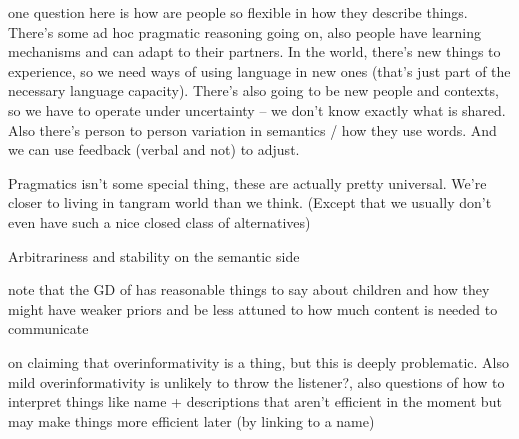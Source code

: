 \documentclass[]{article}
\begin{document}
\cite{hawkins2020b} one question here is how are people so flexible in how they describe things. There's some ad hoc pragmatic reasoning going on, also people have learning mechanisms and can adapt to their partners. In the world, there's new things to experience, so we need ways of using language in new ones (that's just part of the necessary language capacity). There's also going to be new people and contexts, so we have to operate under uncertainty -- we don't know exactly what is shared. Also there's person to person variation in semantics / how they use words. And we can use feedback (verbal and not) to adjust. 

Pragmatics isn't some special thing, these are actually pretty universal. We're closer to living in tangram world than we think. (Except that we usually don't even have such a nice closed class of alternatives) 

Arbitrariness and stability on the semantic side 

note that the GD of \cite{hawkins2021} has reasonable things to say about children and how they might have weaker priors and be less attuned to how much content is needed to communicate 

\cite{heller2012} on claiming that overinformativity is a thing, but this is deeply problematic. Also mild overinformativity is unlikely to throw the listener?, also questions of how to interpret things like name + descriptions that aren't efficient in the moment but may make things more efficient later (by linking to a name) 
\end{document}
